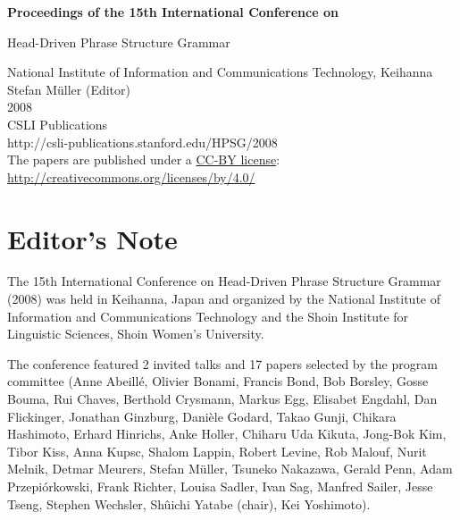 \documentclass[11pt,a4paper,fleqn]{article}
\begin{document}
\begin{center}
{\Large
                {\bfseries Proceedings of the 15th International Conference on\par Head-Driven Phrase Structure Grammar\par}

                \vspace{8ex}

                     National Institute of Information and Communications Technology, Keihanna\\[\baselineskip]

                        Stefan M{\"u}ller (Editor)\\[\baselineskip]

                                2008\\[\baselineskip]

                          CSLI Publications\\[\baselineskip]

              http://csli-publications.stanford.edu/HPSG/2008 \\[4\baselineskip]

The papers are published under a \href{http://creativecommons.org/licenses/by/4.0/}{CC-BY license}:\\[3pt]
\href{http://creativecommons.org/licenses/by/4.0/}{http://creativecommons.org/licenses/by/4.0/}
}
\end{center}
\newpage
\tableofcontents

\newpage

\section{Editor's Note}
The 15th International Conference on Head-Driven Phrase Structure Grammar (2008) was held in Keihanna, Japan
and organized by the National Institute of Information and Communications Technology and the Shoin Institute for Linguistic Sciences,
Shoin Women's University.

The conference featured 2 invited talks and 17 papers
selected by the program committee 
(Anne Abeillé,
Olivier Bonami,
Francis Bond,
Bob Borsley,
Gosse Bouma,
Rui Chaves,
Berthold Crysmann,
Markus Egg,
Elisabet Engdahl,
Dan Flickinger,
Jonathan Ginzburg,
Danièle Godard,
Takao Gunji,
Chikara Hashimoto,
Erhard Hinrichs,
Anke Holler,
Chiharu Uda Kikuta,
Jong-Bok Kim,
Tibor Kiss,
Anna Kupsc,
Shalom Lappin,
Robert Levine,
Rob Malouf,
Nurit Melnik,
Detmar Meurers,
Stefan Müller,
Tsuneko Nakazawa,
Gerald Penn,
Adam Przepiórkowski,
Frank Richter,
Louisa Sadler,
Ivan Sag,
Manfred Sailer,
Jesse Tseng,
Stephen Wechsler,
Sh{\^{u}}ichi Yatabe (chair),
Kei Yoshimoto).
\end{document}

